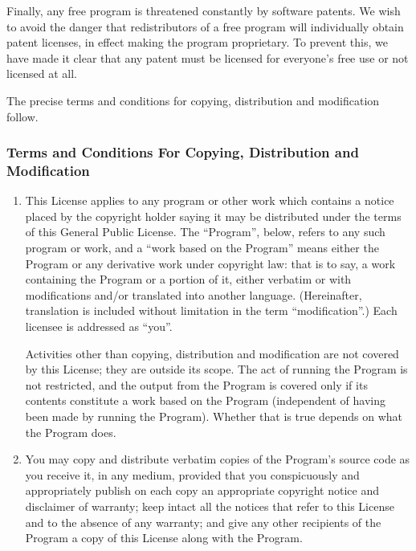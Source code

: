 Finally, any free program is threatened constantly by software patents.
We wish to avoid the danger that redistributors of a free program will
individually obtain patent licenses, in effect making the program
proprietary.  To prevent this, we have made it clear that any patent must
be licensed for everyone's free use or not licensed at all.

The precise terms and conditions for copying, distribution and
modification follow.

\subsubsection{Terms and Conditions For Copying, Distribution and
  Modification}

\begin{enumerate}

\addtocounter{enumi}{-1}

\item 
This License applies to any program or other work which contains a notice
placed by the copyright holder saying it may be distributed under the
terms of this General Public License.  The ``Program'', below, refers to
any such program or work, and a ``work based on the Program'' means either
the Program or any derivative work under copyright law: that is to say, a
work containing the Program or a portion of it, either verbatim or with
modifications and/or translated into another language.  (Hereinafter,
translation is included without limitation in the term ``modification''.)
Each licensee is addressed as ``you''.

Activities other than copying, distribution and modification are not
covered by this License; they are outside its scope.  The act of
running the Program is not restricted, and the output from the Program
is covered only if its contents constitute a work based on the
Program (independent of having been made by running the Program).
Whether that is true depends on what the Program does.

\item You may copy and distribute verbatim copies of the Program's source
  code as you receive it, in any medium, provided that you conspicuously
  and appropriately publish on each copy an appropriate copyright notice
  and disclaimer of warranty; keep intact all the notices that refer to
  this License and to the absence of any warranty; and give any other
  recipients of the Program a copy of this License along with the Program.


\end{enumerate}
